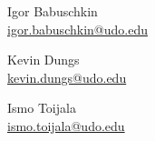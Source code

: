 {\begin{titlepage}
\begin{flushright}
            \begin{minipage}[t]{0.3\textwidth}\begin{flushright}
                \large Igor Babuschkin \\
                \small \href{mailto:igor.babuschkin@udo.edu}{igor.babuschkin@udo.edu}
            \end{flushright}\end{minipage}
            \begin{minipage}[t]{0.3\textwidth}\begin{flushright}
                \large Kevin Dungs \\
                \small \href{mailto:kevin.dungs@udo.edu}{kevin.dungs@udo.edu}
            \end{flushright}\end{minipage}
            \begin{minipage}[t]{0.3\textwidth}\begin{flushright}
                \large Ismo Toijala \\
                \small \href{mailto:ismo.toijala@udo.edu}{ismo.toijala@udo.edu}
            \end{flushright}\end{minipage}

        \end{flushright}
    \end{titlepage}
}

